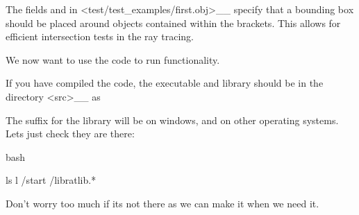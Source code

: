 \documentclass[letterpaper,10pt,english]{sphinxmanual}
\begin{document}
The fields \sphinxcode{\sphinxupquote{!\{}} and \sphinxcode{\sphinxupquote{!\}}} in  \textless{}test/test\_examples/first.obj\textgreater{}\textasciigrave{}\_\_ specify that a bounding box should be placed around objects contained within the brackets. This allows for efficient intersection tests in the ray tracing.

We now want to use the code  to run  functionality.

If you have compiled the code, the executable and library should be in the directory  \textless{}src\textgreater{}\textasciigrave{}\_\_ as

\begin{sphinxVerbatim}[commandchars=\\\{\}]
\PYG{p}{[}\PYG{p}{]}
\end{sphinxVerbatim}

The suffix for the library will be  on windows, and  on other operating systems. Lets just check they are there:

{
\begin{sphinxVerbatim}[commandchars=\\\{\}]
\llap{\color{nbsphinxin}[ ]:\,\hspace{\fboxrule}\hspace{\fboxsep}}\PYGZpc{}\PYGZpc{}bash


ls \PYGZhy{}l /start /libratlib.*
\end{sphinxVerbatim}
}

Don’t worry too much if its not there as we can make it when we need it.
\end{document}
